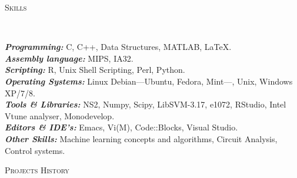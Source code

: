 \documentclass[9pt]{article}
\newenvironment{changemargin}[2]{%
  \begin{list}{}{%
    \setlength{\topsep}{0pt}%
    \setlength{\leftmargin}{#1}%
    \setlength{\rightmargin}{#2}%
    \setlength{\listparindent}{\parindent}%
    \setlength{\itemindent}{\parindent}%
    \setlength{\parsep}{\parskip}%
  }%
  \item[]}{\end{list}
}
\newcommand{\lineover}{
	\begin{changemargin}{-0.05in}{-0.05in}
		\vspace*{-8pt}
		\hrulefill \\
		\vspace*{-2pt}
	\end{changemargin}
}
\newcommand{\header}[1]{
	\begin{changemargin}{-0.5in}{-0.5in}
		\scshape{#1}\\
  	\lineover
	\end{changemargin}
}
\newenvironment{body} {
	\vspace*{-16pt}
	\begin{changemargin}{-0.25in}{-0.5in}
  }	
	{\end{changemargin}
}
\begin{document}
\smallskip

\header{Skills}

\begin{body}
	\vspace{14pt}
	\emph{\textbf{Programming:}}{} C, C++, Data Structures, MATLAB, \LaTeX. \\
	\medskip
	\emph{\textbf{Assembly language:}}{} MIPS, IA32. \\
	\medskip
	\emph{\textbf{Scripting:}}{} R, Unix Shell Scripting, Perl, Python. \\
	\medskip
	\emph{\textbf{Operating Systems:}}{} Linux Debian---Ubuntu, Fedora, Mint---, Unix, Windows XP/7/8. \\
	\medskip
	\emph{\textbf{Tools \& Libraries:}}{} NS2, Numpy, Scipy, LibSVM-3.17, e1072, RStudio, Intel Vtune analyser, Monodevelop. \\
	\medskip
	\emph{\textbf{Editors \& IDE's:}}{} Emacs, Vi(M), Code::Blocks, Visual Studio. \\
	\medskip
	\emph{\textbf{Other Skills:}}{} Machine learning concepts and algorithms, Circuit Analysis, Control systems.
\end{body}

\smallskip

\header{Projects History}
\end{document}
